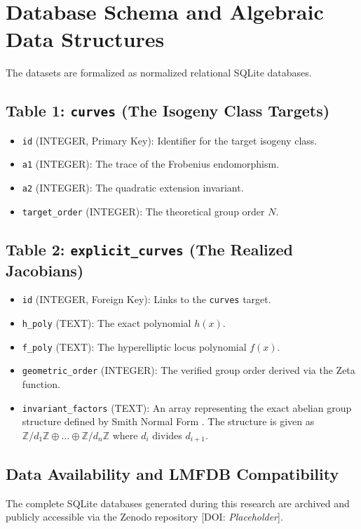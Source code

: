 \documentclass[12pt, letterpaper]{article}
\begin{document}
\section{Database Schema and Algebraic Data Structures}
The datasets are formalized as normalized relational SQLite databases. 

\subsection{Table 1: \texttt{curves} (The Isogeny Class Targets)}
\begin{itemize}
    \item \texttt{id} (INTEGER, Primary Key): Identifier for the target isogeny class.
    \item \texttt{a1} (INTEGER): The trace of the Frobenius endomorphism.
    \item \texttt{a2} (INTEGER): The quadratic extension invariant.
    \item \texttt{target\_order} (INTEGER): The theoretical group order $N$.
\end{itemize}

\subsection{Table 2: \texttt{explicit\_curves} (The Realized Jacobians)}
\begin{itemize}
    \item \texttt{id} (INTEGER, Foreign Key): Links to the \texttt{curves} target.
    \item \texttt{h\_poly} (TEXT): The exact polynomial $h(x)$.
    \item \texttt{f\_poly} (TEXT): The hyperelliptic locus polynomial $f(x)$.
    \item \texttt{geometric\_order} (INTEGER): The verified group order derived via the Zeta function.
    \item \texttt{invariant\_factors} (TEXT): An array representing the exact abelian group structure defined by Smith Normal Form \cite{Smith1861}. The structure is given as $\mathbb{Z}/d_1\mathbb{Z} \oplus \dots \oplus \mathbb{Z}/d_n\mathbb{Z}$ where $d_i$ divides $d_{i+1}$.
\end{itemize}

\subsection{Data Availability and LMFDB Compatibility}
The complete SQLite databases generated during this research are archived and publicly accessible via the Zenodo repository [DOI: \textit{Placeholder}]. 
\end{document}
